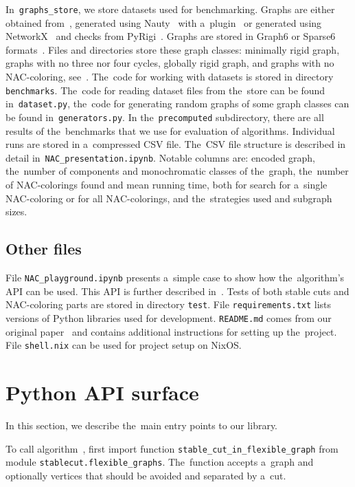 In~\texttt{graphs\_store}, we store datasets used for benchmarking.
Graphs are either obtained from~\cite{extremal_graphs},
generated using Nauty~\cite{nauty} with a~plugin~\cite{nauty_plugin}
or generated using NetworkX~\cite{networkx} and checks from PyRigi~\cite{pyrigi}.
Graphs are stored in Graph6 or Sparse6 formats~\cite{graph6}.
%
Files and directories store these graph classes:
minimally rigid graph, graphs with no three nor four cycles, globally rigid graph,
and graphs with no NAC-coloring, see~.
%
The~code for working with datasets is stored in directory \texttt{benchmarks}.
The~code for reading dataset files from the~store can be found in~\texttt{dataset.py},
the~code for generating random graphs of some graph classes
can be found in~\texttt{generators.py}.
%
In the~\texttt{precomputed} subdirectory, there are all results of the~benchmarks that
we use for evaluation of algorithms.
Individual runs are stored in a~compressed CSV file.
The~CSV file structure is described in detail in~\texttt{NAC\_presentation.ipynb}.
Notable columns are:
encoded graph,
the~number of \trcon{} components and monochromatic classes of the~graph,
the~number of NAC-colorings found and mean running time,
both for search for a~single NAC-coloring or for all NAC-colorings,
and the~strategies used and subgraph sizes.


\subsection{Other files}

File \texttt{NAC\_playground.ipynb} presents a~simple case
to show how the~algorithm's API can be used.
This API is further described in~.
%
Tests of both stable cuts and NAC-coloring parts are stored in directory \texttt{test}.
%
File \texttt{requirements.txt} lists versions of Python libraries used for development.
\texttt{README.md} comes from our original paper~\cite{my_paper}
and contains additional instructions for setting up the~project.
File \texttt{shell.nix} can be used for project setup on NixOS\@.


\section{Python API surface}%
\label{sec:impl_python_api}

In this section,
we describe the~main entry points to our library.

To call algorithm~,
first import function \texttt{stable\_cut\_in\_flexible\_graph}
from module \texttt{stablecut.flexible\_graphs}.
The~function accepts a~graph and
optionally vertices that should be avoided and separated by a~cut.

